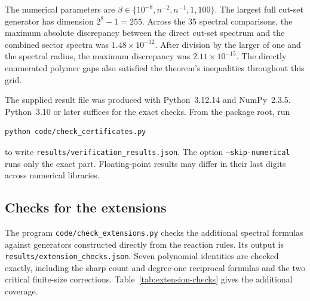 The numerical parameters are $\beta\in\{10^{-8},n^{-2},n^{-1},1,100\}$. The largest full cut-set generator has dimension $2^8-1=255$. Across the 35 spectral comparisons, the maximum absolute discrepancy between the direct cut-set spectrum and the combined sector spectra was $1.48\times10^{-12}$. After division by the larger of one and the spectral radius, the maximum discrepancy was $2.11\times10^{-15}$. The directly enumerated polymer gaps also satisfied the theorem's inequalities throughout this grid.

The supplied result file was produced with Python~3.12.14 and NumPy~2.3.5. Python~3.10 or later suffices for the exact checks. From the package root, run
\begin{verbatim}
python code/check_certificates.py
\end{verbatim}
to write \texttt{results/verification\_results.json}. The option \texttt{--skip-numerical} runs only the exact part. Floating-point results may differ in their last digits across numerical libraries.


\subsection{Checks for the extensions}

The program \texttt{code/check\_extensions.py} checks the additional
spectral formulas against generators constructed directly from the
reaction rules. Its output is
\texttt{results/extension\_checks.json}. Seven polynomial identities
are checked exactly, including the sharp count and degree-one
reciprocal formulas and the two critical finite-size corrections.
Table~\ref{tab:extension-checks} gives the additional coverage.

